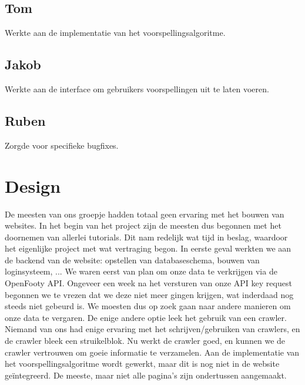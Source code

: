 \documentclass[11pt, a4paper]{article}
\begin{document}
\subsection{Tom}
Werkte aan de implementatie van het voorspellingsalgoritme.
\subsection{Jakob}
Werkte aan de interface om gebruikers voorspellingen uit te laten voeren.
\subsection{Ruben}
Zorgde voor specifieke bugfixes.

\section{Design}
De meesten van ons groepje hadden totaal geen ervaring met het bouwen van websites. In het begin van het project zijn de meesten dus begonnen met het doornemen van allerlei tutorials. Dit nam redelijk wat tijd in beslag, waardoor het eigenlijke project met wat vertraging begon. In eerste geval werkten we aan de backend van de website: opstellen van databaseschema, bouwen van loginsysteem, ... We waren eerst van plan om onze data te verkrijgen via de OpenFooty API. Ongeveer een week na het versturen van onze API key request begonnen we te vrezen dat we deze niet meer gingen krijgen, wat inderdaad nog steeds niet gebeurd is. We moesten dus op zoek gaan naar andere manieren om onze data te vergaren. De enige andere optie leek het gebruik van een crawler. Niemand van ons had enige ervaring met het schrijven/gebruiken van crawlers, en de crawler bleek een struikelblok. Nu werkt de crawler goed, en kunnen we de crawler vertrouwen om goeie informatie te verzamelen. Aan de implementatie van het voorspellingsalgoritme wordt gewerkt, maar dit is nog niet in de website ge\"integreerd. De meeste, maar niet alle pagina's zijn ondertussen aangemaakt.
\end{document}
